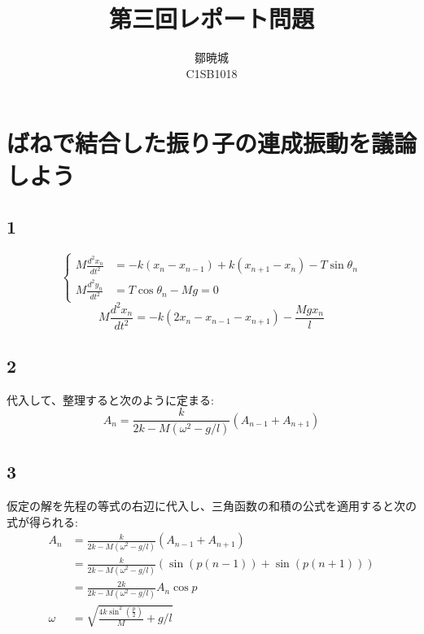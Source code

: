 \documentclass{jreport}
\begin{document}
\title{第三回レポート問題}
\author{鄒暁城\\ C1SB1018}
\maketitle
\setcounter{chapter}{3}
\newpage
\tableofcontents
{}
\newpage
\section{ばねで結合した振り子の連成振動を議論しよう}
\subsection{1}
\begin{equation}
	\left\{
	\begin{aligned}
		M\frac{d^2x_n}{dt^2} &= -k(x_n -x_{n-1}) + k(x_{n+1} -x_n) -T\sin \theta_n \\
		M\frac{d^2y_n}{dt^2} &= T\cos \theta_n -Mg =0
	\end{aligned}
	\right.
\end{equation}
\begin{equation}
	M\frac{d^2x_n}{dt^2} = -k(2x_n-x_{n-1}-x_{n+1})-\frac{Mgx_n}{l}
\end{equation}
\subsection{2}
代入して、整理すると次のように定まる:\\
\begin{equation}
	A_n = \frac{k}{2k-M(\omega^2 - g/l)} (A_{n-1} +A_{n+1})
\end{equation}
\subsection{3}
仮定の解を先程の等式の右辺に代入し、三角函数の和積の公式を適用すると次の式が得られる:\\
\begin{equation}
	\begin{aligned}
	  A_n &= \frac{k}{2k-M(\omega^2 - g/l)} (A_{n-1} +A_{n+1})\\
	      &= \frac{k}{2k-M(\omega^2 - g/l)} (\sin (p(n-1)) +\sin (p(n+1)))\\
	      &= \frac{2k}{2k-M(\omega^2 - g/l)} A_n\cos p \\
	  \omega &= \sqrt{\frac{4k\sin^2(\frac{p}{2})}{M} + g/l}
	\end{aligned}
\end{equation}
\end{document}
